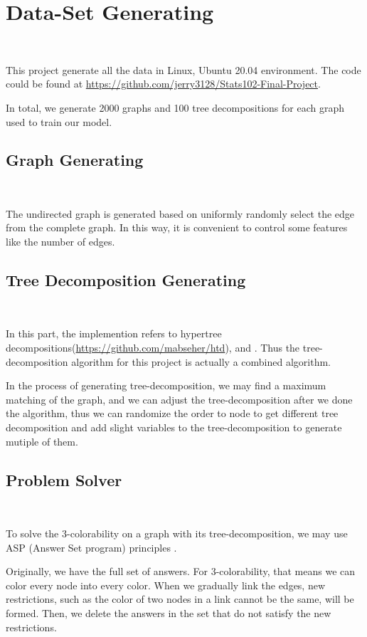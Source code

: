 \section{Data-Set Generating}~\label{sec.DataGen}

This project generate all the data in Linux, Ubuntu 20.04 environment. The code could be found at \url{https://github.com/jerry3128/Stats102-Final-Project}.

In total, we generate 2000 graphs and 100 tree decompositions for each graph used to train our model.

\subsection{Graph Generating}~\label{sec.DataGen1}

The undirected graph is generated based on uniformly randomly select the edge from the complete graph. In this way, it is convenient to control some features like the number of edges.

\subsection{Tree Decomposition Generating}~\label{sec.DataGen2}

In this part, the implemention refers to hypertree decompositions(\url{https://github.com/mabseher/htd}), and \cite{BHL1996LinearTreeDeomposition}. Thus the tree-decomposition algorithm for this project is actually a combined algorithm.

In the process of generating tree-decomposition, we may find a maximum matching of the graph, and we can adjust the tree-decomposition after we done the algorithm, thus we can randomize the order to node to get different tree decomposition and add slight variables to the tree-decomposition to generate mutiple of them.

\subsection{Problem Solver}~\label{sec.DataGen3}

To solve the 3-colorability on a graph with its tree-decomposition, we may use ASP (Answer Set program) principles \cite{ASP2008}.

Originally, we have the full set of answers. For 3-colorability, that means we can color every node into every color. When we gradually link the edges, new restrictions, such as the color of two nodes in a link cannot be the same, will be formed. Then, we delete the answers in the set that do not satisfy the new restrictions.

